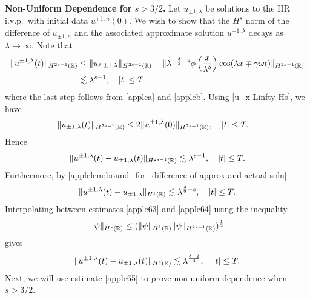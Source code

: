 \textbf{Non-Uniform Dependence for $s>3/2$.}
Let $u_{\pm 1,\lambda}$ be solutions to the HR i.v.p.\ with initial 
data $u^{\pm 1,
n}(0)$. We wish to show that the $H^s$ norm of the difference of $u_{\pm 1,
n}$ and the associated approximate solution $u^{\pm 1,\lambda}$
decays as $\lambda \to \infty$. Note that
%
%
\begin{equation*}
\begin{split}
\label{apple62}
\|u^{\pm 1, \lambda}(t)\|_{H^{2s-1}(\mathbb{R})}
& \le \|u_{\ell, \pm 1, \lambda}\|_{H^{2s-1}(\mathbb{R})} +
\| \lambda^{-\frac{\delta}{2} -s} \phi \left(
\frac{x}{\lambda^\delta} \right) \cos(\lambda x \mp \gamma \omega t)
\|_{H^{2s-1}(\mathbb{R})}
\\
& \lesssim \lambda^{s-1}, \quad |t| \le T
\end{split}
\end{equation*}
%
%
where the last step follows from \cref{applea} and \cref{appleb}.
Using \eqref{u_x-Linfty-Hs}, we have 
%
\begin{equation*}
\begin{split}
\|u_{\pm 1,\lambda} (t) \|_{H^{2s-1}(\mathbb{R})}
& \le 2 \|u^{\pm 1,\lambda}(0) \|_{H^{2s-1}(\mathbb{R})}, \quad
|t| \le T.
\label{apple60}
\end{split}
\end{equation*}
%
%
%
%
Hence
%
\begin{equation}
\begin{split}
\|u^{\pm 1, \lambda}(t) - u_{\pm 1, \lambda}(t) \|_{H^{2s-1}(\mathbb{R})}
\lesssim \lambda^{s-1}, \quad |t| \le T.
\label{apple63}
\end{split}
\end{equation}
%
%
Furthermore, by 
\cref{applelem:bound_for_difference-of-approx-and-actual-soln} 
%
%
\begin{equation}
\begin{split}
\|u^{\pm 1, \lambda}(t) - u_{\pm 1, \lambda} \|_{H^1(\mathbb{R})} \lesssim
\lambda^{\frac{\delta}{2} -s}, \quad |t| \le T.
\label{apple64}
\end{split}
\end{equation}
%
%
%
%
%
%
%
%
Interpolating between estimates \eqref{apple63} and \eqref{apple64} using 
the inequality
\begin{equation*}
\label{apple403}
\|\psi \|_{H^s (\mathbb{R})} \leq  (\| \psi \|_{H^1 (\mathbb{R})} \| \psi
\|_{H^{2s-1}(\mathbb{R})})^\frac12
\end{equation*}
%
%
gives
%
%
\begin{equation}
\begin{split}
\|u^{\pm 1, \lambda}(t) - u_{\pm 1, \lambda}(t)
\|_{H^s(\mathbb{R})}
\lesssim \lambda^{\frac{\delta -2}{4}}, \quad |t| \le T.
\label{apple65}
\end{split}
\end{equation}
%
%
Next, we will use estimate \eqref{apple65} to prove non-uniform
dependence when $s > 3/2$.

